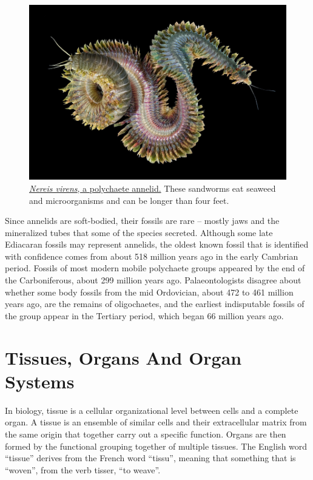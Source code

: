 \begin{figure}

{\centering \includegraphics[width=0.7\linewidth]{./figures/animals/Nereis_virens} 

}

\caption{\href{https://commons.wikimedia.org/wiki/File:Nereis_virens.jpg}{\emph{Nereis virens}, a polychaete annelid.} These sandworms eat seaweed and microorganisms and can be longer than four feet.}\label{fig:polychaete}
\end{figure}

Since annelids are soft-bodied, their fossils are rare -- mostly jaws and the mineralized tubes that some of the species secreted. Although some late Ediacaran fossils may represent annelids, the oldest known fossil that is identified with confidence comes from about 518 million years ago in the early Cambrian period. Fossils of most modern mobile polychaete groups appeared by the end of the Carboniferous, about 299 million years ago. Palaeontologists disagree about whether some body fossils from the mid Ordovician, about 472 to 461 million years ago, are the remains of oligochaetes, and the earliest indisputable fossils of the group appear in the Tertiary period, which began 66 million years ago.

\hypertarget{tissues-organs-and-organ-systems}{%
\section{Tissues, Organs And Organ Systems}\label{tissues-organs-and-organ-systems}}

In biology, tissue is a cellular organizational level between cells and a complete organ. A tissue is an ensemble of similar cells and their extracellular matrix from the same origin that together carry out a specific function. Organs are then formed by the functional grouping together of multiple tissues. The English word ``tissue'' derives from the French word ``tissu'', meaning that something that is ``woven'', from the verb tisser, ``to weave''.

